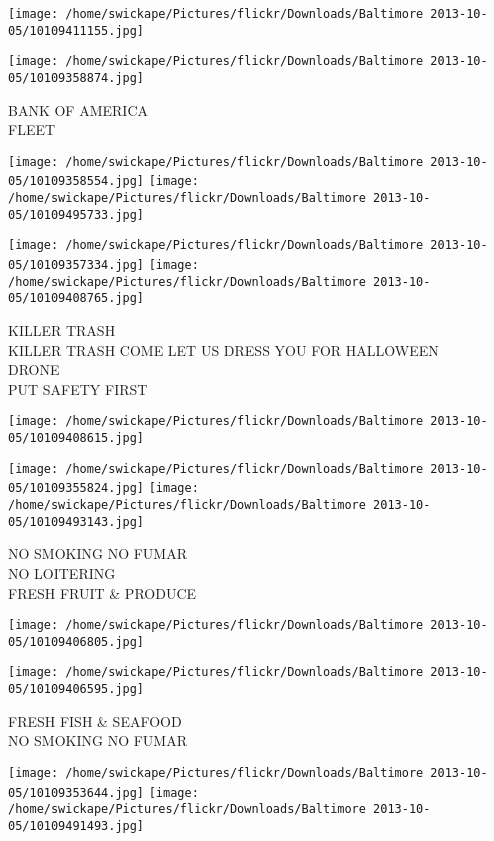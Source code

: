 \documentclass[10pt,letterpaper]{article}
\begin{document}
\texttt{[image: /home/swickape/Pictures/flickr/Downloads/Baltimore 2013-10-05/10109411155.jpg]}

\vspace{0.25in}
\texttt{[image: /home/swickape/Pictures/flickr/Downloads/Baltimore 2013-10-05/10109358874.jpg]}

BANK OF AMERICA\\
FLEET
\pagebreak

\texttt{[image: /home/swickape/Pictures/flickr/Downloads/Baltimore 2013-10-05/10109358554.jpg]}
\texttt{[image: /home/swickape/Pictures/flickr/Downloads/Baltimore 2013-10-05/10109495733.jpg]}

\texttt{[image: /home/swickape/Pictures/flickr/Downloads/Baltimore 2013-10-05/10109357334.jpg]}
\texttt{[image: /home/swickape/Pictures/flickr/Downloads/Baltimore 2013-10-05/10109408765.jpg]}

KILLER TRASH\\
KILLER TRASH COME LET US DRESS YOU FOR HALLOWEEN\\
DRONE\\
PUT SAFETY FIRST
\pagebreak

\texttt{[image: /home/swickape/Pictures/flickr/Downloads/Baltimore 2013-10-05/10109408615.jpg]}

\vspace{0.25in}
\texttt{[image: /home/swickape/Pictures/flickr/Downloads/Baltimore 2013-10-05/10109355824.jpg]}
\texttt{[image: /home/swickape/Pictures/flickr/Downloads/Baltimore 2013-10-05/10109493143.jpg]}

NO SMOKING NO FUMAR\\
NO LOITERING\\
FRESH FRUIT \& PRODUCE
\pagebreak

\texttt{[image: /home/swickape/Pictures/flickr/Downloads/Baltimore 2013-10-05/10109406805.jpg]}

\vspace{0.25in}
\texttt{[image: /home/swickape/Pictures/flickr/Downloads/Baltimore 2013-10-05/10109406595.jpg]}

FRESH FISH \& SEAFOOD\\
NO SMOKING NO FUMAR
\pagebreak

\texttt{[image: /home/swickape/Pictures/flickr/Downloads/Baltimore 2013-10-05/10109353644.jpg]}
\texttt{[image: /home/swickape/Pictures/flickr/Downloads/Baltimore 2013-10-05/10109491493.jpg]}
\end{document}
